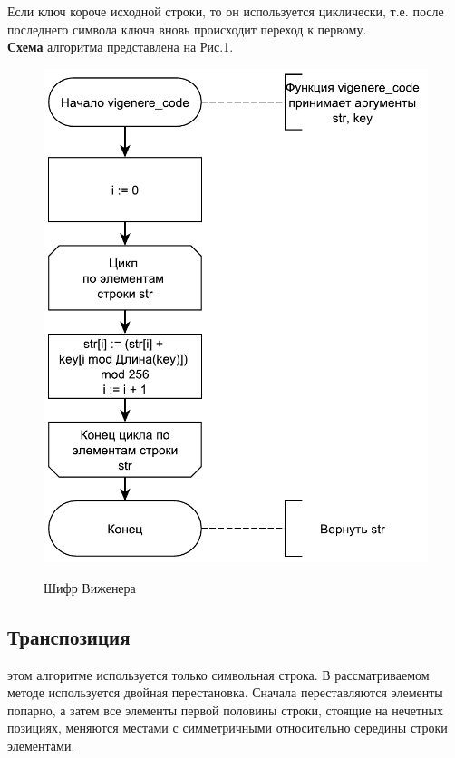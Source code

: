 Если ключ короче исходной строки, то он используется циклически, т.е. после последнего символа ключа вновь происходит переход к первому.\\

\textbf{Схема} алгоритма представлена на Рис.\ref{fig2:image}.\\
\begin{figure}[h]
	\begin{center}
		{\includegraphics[scale = 0.65]{schemes/vigenere}}
		\caption{Шифр Виженера}
		\label{fig2:image}
	\end{center}
\end{figure}

\newpage

\subsection{Транспозиция}
 этом алгоритме используется только символьная строка. В рассматриваемом методе используется двойная перестановка. Сначала переставляются элементы попарно, а затем все элементы первой половины строки, стоящие на нечетных позициях, меняются местами с симметричными относительно середины строки элементами.\\

